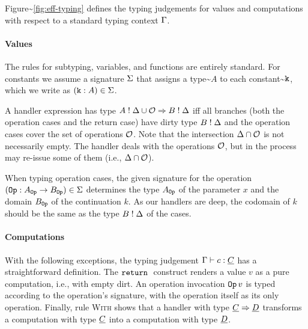 \documentclass[master=cws,masteroption=ai, english]{kulemt}
\begin{document}
Figure\textasciitilde{}\ref{fig:eff-typing} defines the typing
judgements for values and computations with respect to a standard typing
context \(\Gamma\).

\paragraph{Values}

The rules for subtyping, variables, and functions are entirely standard.
For constants we assume a signature \(\Sigma\) that assigns a
type\textasciitilde{}\(A\) to each constant\textasciitilde{}\(\mathtt{k}\),
which we write as \((\mathtt{k} \mathrel{:} A) \in \Sigma\).

A handler expression has type \(A \mathrel{!} \Delta \cup \mathcal{O} \Rightarrow B \mathrel{!} \Delta\)
iff all branches (both the operation cases and the return case) have
dirty type \(B \mathrel{!} \Delta\) and the operation cases cover the set of
operations \(\mathcal{O}\). Note that the intersection \(\Delta \cap \mathcal{O}\) is
not necessarily empty. The handler deals with the operations \(\mathcal{O}\),
but in the process may re-issue some of them (i.e.,
\(\Delta \cap \mathcal{O}\)).

When typing operation cases, the given signature for the operation
\((\mathtt{Op} \mathrel{:} A_{\mathtt{Op}} \to B_{\mathtt{Op}}) \in \Sigma\) determines the type \(A_{\mathtt{Op}}\) of
the parameter \(x\) and the domain \(B_{\mathtt{Op}}\) of the continuation \(k\).
As our handlers are deep, the codomain of \(k\) should be the same as
the type \(B \mathrel{!} \Delta\) of the cases.

\paragraph{Computations}

With the following exceptions, the typing judgement \(\Gamma \vdash c : \underline{C}\)
has a straightforward definition. The \(\mathtt{return}\;\) construct renders a value
\(v\) as a pure computation, i.e., with empty dirt. An operation
invocation \(\mathtt{Op}\,v\) is typed according to the operation's signature,
with the operation itself as its only operation. Finally, rule
\textsc{With} shows that a handler with type \(\underline{C} \Rightarrow \underline{D}\) transforms a
computation with type \(\underline{C}\) into a computation with type \(\underline{D}\).
\end{document}
